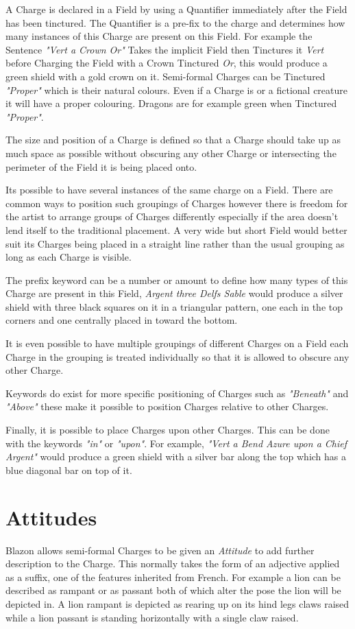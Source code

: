 A Charge is declared in a Field by using a Quantifier immediately after the Field has been tinctured.  The Quantifier is a pre-fix to the charge and determines how many instances of this Charge are present on this Field.  For example the Sentence \emph{"Vert a Crown Or"} Takes the implicit Field then Tinctures it \emph{Vert} before Charging the Field with a Crown Tinctured \emph{Or}, this would produce a green shield with a gold crown on it. Semi-formal Charges can be Tinctured \emph{"Proper"} which is their natural colours.  Even if a Charge is or a fictional creature it will have a proper colouring.  Dragons are for example green when Tinctured \emph{"Proper"}. 

The size and position of a Charge is defined so that a Charge should take up as much space as possible without obscuring any other Charge or intersecting the perimeter of the Field it is being placed onto.  

Its possible to have several instances of the same charge on a Field. There are common ways to position such groupings of Charges however there is freedom for the artist to arrange groups of Charges differently especially if the area doesn't lend itself to the traditional placement.  A very wide but short Field would better suit its Charges being placed in a straight line rather than the usual grouping as long as each Charge is visible. 


The prefix keyword can be a number or amount to define how many types of this Charge are present in this Field, \emph{Argent three Delfs Sable} would produce a silver shield with three black squares on it in a triangular pattern, one each in the  top corners and one centrally placed in toward the bottom. 

It is even possible to have multiple groupings of different Charges on a Field each Charge in the grouping is treated individually so that it is allowed to obscure any other Charge.  

Keywords do exist for more specific positioning of Charges such as \emph{"Beneath"} and \emph{"Above"} these make it possible to position Charges relative to other Charges.

Finally, it is possible to place Charges upon other Charges.  This can be done with the keywords \emph{"in"} or \emph{"upon"}. For example, \emph{"Vert a Bend Azure upon a Chief Argent"} would produce a green shield with a silver bar along the top which has a blue diagonal bar on top of it.

\section{Attitudes}
Blazon allows semi-formal Charges to be given an \emph{Attitude} to add further description to the Charge.  This normally takes the form of an adjective applied as a suffix, one of the features inherited from French.  For example a lion can be described as rampant or as passant both of which alter the pose the lion will be depicted in.  A lion rampant is depicted as rearing up on its hind legs claws raised while a lion passant is standing horizontally with a single claw raised. 

